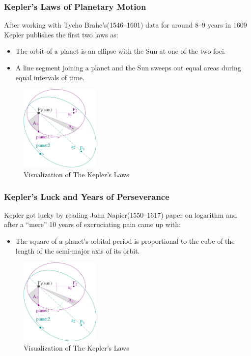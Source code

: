 \documentclass{beamer}
\theoremstyle{definition}
\theoremstyle{remark}
\begin{document}
\begin{frame}
  \frametitle{Kepler's Laws of Planetary Motion}
  \pause
  After working with Tycho Brahe's(1546--1601) data for around 8--9 years in 1609 Kepler publishes the first two laws as:
  \pause
  \begin{itemize}[<+->]
    \item The orbit of a planet is an ellipse with the Sun at one of the two foci.
    \item A line segment joining a planet and the Sun sweeps out equal areas during equal intervals of time.
  \end{itemize}
  \pause
    \begin{figure}
      \centering
      \includegraphics[width=0.35\textwidth]{./data/image/kepler_laws_diagram.pdf}
    \caption{Visualization of The Kepler's Laws}
    \end{figure}
  \end{frame}
  \begin{frame}
    \frametitle{Kepler's Luck and Years of Perseverance}
    Kepler got lucky by reading John Napier(1550--1617) paper on logarithm and after a ``mere'' 10 years of 
    excruciating pain came up with:
    \pause
    \begin{itemize}[<+->]
      \item The square of a planet's orbital period is proportional to the cube of the length of the semi-major axis of its orbit.
    \end{itemize}
    \pause
      \begin{figure}
        \centering
        \includegraphics[width=0.35\textwidth]{./data/image/kepler_laws_diagram.pdf}
      \caption{Visualization of The Kepler's Laws}
      \label{image:kepler_luck_napier}
      \end{figure}
    \end{frame}
\end{document}
